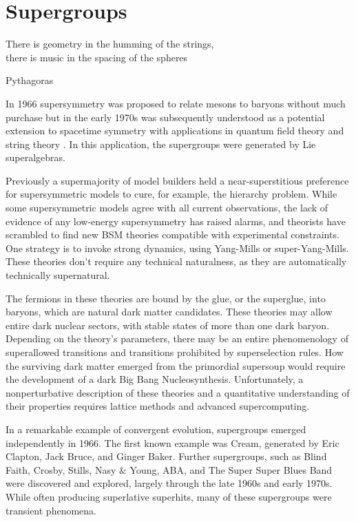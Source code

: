 \section{Supergroups}

\epigraph{There is geometry in the humming of the strings,\\
there is music in the spacing of the spheres}{Pythagoras}


In 1966 supersymmetry was proposed to relate mesons to baryons\cite{doi:10.1143/PTP.36.1266} without much purchase but in the early 1970s was subsequently understood as a potential extension to spacetime symmetry with applications in quantum field theory and string theory \cite{Gervais:1971ji,Ramond:1971gb,Volkov:1973ix,Wess:1974tw}.
In this application, the supergroups were generated by Lie superalgebras.

Previously a supermajority of model builders held a near-superstitious preference for supersymmetric models to cure, for example, the hierarchy problem.
While some supersymmetric models agree with all current observations\cite{fox:2005}, the lack of evidence of any low-energy supersymmetry has raised alarms, and theorists have scrambled to find new BSM theories compatible with experimental constraints.
One strategy is to invoke strong dynamics, using Yang-Mills or super-Yang-Mills.
These theories don't require any technical naturalness, as they are automatically technically supernatural.

The fermions in these theories are bound by the glue, or the superglue, into baryons, which are natural dark matter candidates.
These theories may allow entire dark nuclear sectors, with stable states of more than one dark baryon.
Depending on the theory's parameters, there may be an entire phenomenology of superallowed transitions and transitions prohibited by superselection rules.
How the surviving dark matter emerged from the primordial supersoup would require the development of a dark Big Bang Nucleosynthesis.
Unfortunately, a nonperturbative description of these theories and a quantitative understanding of their properties requires lattice methods and advanced supercomputing\cite{Detmold:2014qqa,Detmold:2014kba}.

In a remarkable example of convergent evolution, supergroups emerged independently in 1966.
The first known example was Cream, generated by Eric Clapton, Jack Bruce, and Ginger Baker\cite{supergroups}.
Further supergroups, such as Blind Faith, Crosby, Stills, Nasy \& Young, ABA, and The Super Super Blues Band\cite{supersuperblues} were discovered and explored, largely through the late 1960s and early 1970s.
While often producing superlative superhits, many of these supergroups were transient phenomena.